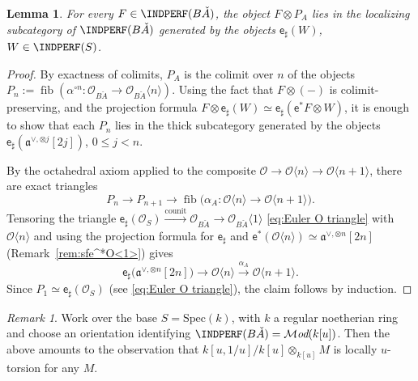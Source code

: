 \documentclass[12pt, oneside]{amsart}
\numberwithin{equation}{section}
\newtheorem{lemma}[subsubsection]{Lemma}
\theoremstyle{remark}
\newtheorem{remark}[subsubsection]{Remark}
\theoremstyle{plain}
\renewcommand{\le}{\leqslant}
\newcommand{\MOD}{\mathcal{M}\textit{od}}
\newcommand{\fra}{\mathfrak{a}}
\newcommand{\OO}{\mathcal{O}}
\newcommand{\Thom}[1]{\langle #1 \rangle}
\newcommand{\sfe}{\mathsf{e}}
\begin{document}
\begin{lemma}\label{lem:P induced}
For every $F \in \INDPERF(B\check{A})$, the object $F \otimes P_A$ lies in the localizing subcategory of $\INDPERF(B\check{A})$ generated by the objects $\sfe_\sharp(W)$, $W \in \INDPERF(S)$.
\end{lemma}
\begin{proof}
  By exactness of colimits, $P_A$ is the colimit over $n$ of the objects $P_n := \operatorname{fib}(\alpha^{\circ n} : \OO_{B\check{A}} \to \OO_{B\check{A}}\Thom{n})$.
  Using the fact that $F \otimes (-)$ is colimit-preserving, and the projection formula $F \otimes \sfe_\sharp(W) \simeq \sfe_\sharp(\sfe^*F \otimes W)$, it is enough to show that each $P_n$ lies in the thick subcategory generated by the objects $\sfe_\sharp(\fra^{\vee,\otimes j}[2j])$, $0 \le j < n$.

  By the octahedral axiom applied to the composite $\OO \to \OO\Thom{n} \to \OO\Thom{n+1}$, there are exact triangles
  \[
    P_n \longrightarrow P_{n+1} \longrightarrow \operatorname{fib}\bigl( \alpha_A : \OO\Thom{n} \to \OO\Thom{n+1} \bigr).
  \]
  Tensoring the triangle $\sfe_\sharp (\OO_S) \xrightarrow{\mathrm{counit}} \OO_{B\check{A}} \to \OO_{B\check{A}}\Thom{1}$ \eqref{eq:Euler O triangle} with $\OO\Thom{n}$ and using the projection formula for $\sfe_\sharp$ and $\sfe^*(\OO\Thom{n}) \simeq \fra^{\vee, \otimes n}[2n]$ (Remark~\ref{rem:sfe^*O<1>}) gives
  \[
    \sfe_\sharp\bigl( \fra^{\vee, \otimes n}[2n] \bigr)
    \longrightarrow \OO\Thom{n}
    \xrightarrow{\alpha_A} \OO\Thom{n+1}.
  \]
  Since $P_1 \simeq \sfe_\sharp(\OO_S)$ (see \eqref{eq:Euler O triangle}), the claim follows by induction.
\end{proof}

\begin{remark} Work over the base $S=\text{Spec}(k)$, with $k$ a regular noetherian ring and choose an orientation identifying $\INDPERF(B\check{A})=\MOD(k[u])$. Then the above amounts to the observation that $k[u,1/u]/k[u]\otimes_{k[u]} M$ is locally $u$-torsion for any $M$. \end{remark}
\end{document}
